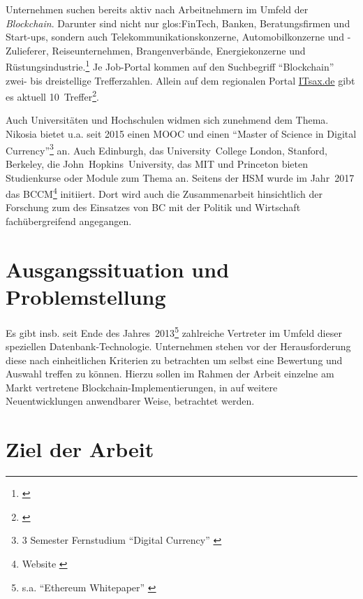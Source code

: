 Unternehmen suchen bereits aktiv nach Arbeitnehmern im Umfeld der \emph{Blockchain}.
Darunter sind nicht nur \gls{glos:FinTech}, Banken, Beratungsfirmen und Start-ups, sondern auch Telekommunikationskonzerne, Automobilkonzerne und -Zulieferer, Reiseunternehmen, Brangenverbände, Energiekonzerne und Rüstungsindustrie.\footnote{\cite{w:jobsearch-bc-stepstone}}
Je Job-Portal kommen auf den Suchbegriff \enquote{Blockchain} zwei- bis dreistellige Trefferzahlen.
Allein auf dem regionalen Portal \href{https://www.itsax.de/}{ITsax.de} gibt es aktuell 10~Treffer\footnote{\cite{w:jobsearch-bc-itsax}}.

Auch Universitäten und Hochschulen widmen sich zunehmend dem Thema. Nikosia bietet u.a. seit 2015 einen \gls{MOOC} und einen \enquote{Master of Science in Digital Currency}\footnote{3 Semester Fernstudium \enquote{Digital Currency} \autocite{w:unic-master-dc}} an. Auch Edinburgh, das \mbox{University College} London, Stanford, Berkeley, die \mbox{John Hopkins University}, das \gls{MIT} und Princeton bieten Studienkurse oder Module zum Thema an. 
Seitens der \gls{HSM} wurde im Jahr~2017 das \gls{BCCM}\footnote{Website \autocite{w:bccm}} initiiert. Dort wird auch die Zusammenarbeit hinsichtlich der Forschung zum des Einsatzes von \gls{BC} mit der Politik und Wirtschaft fachübergreifend angegangen.

\newpage
\section{Ausgangssituation und Problemstellung}\label{sec:problemstellung}

Es gibt insb. seit Ende des Jahres~2013\footnote{s.a. \enquote{Ethereum Whitepaper} \autocite{p:ethereum}} zahlreiche Vertreter im Umfeld dieser speziellen Datenbank-Technologie.
Unternehmen stehen vor der Herausforderung diese nach einheitlichen Kriterien zu betrachten um selbst eine Bewertung und Auswahl treffen zu können.
Hierzu sollen im Rahmen der Arbeit einzelne am Markt vertretene Blockchain-Implementierungen, in auf weitere Neuentwicklungen anwendbarer Weise, betrachtet werden.

\section{Ziel der Arbeit}


